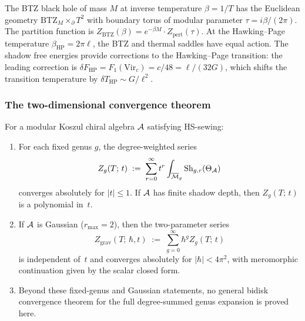 \begin{example}
\label{ex:thqg-I-btz-beta}
The BTZ black hole of mass $M$ at inverse temperature $\beta = 1/T$ has the Euclidean geometry $\mathrm{BTZ}_M \times_\partial T^2$ with boundary torus of modular parameter $\tau = i\beta/(2\pi)$. The partition function is $Z_{\mathrm{BTZ}}(\beta) = e^{-\beta M} \cdot Z_{\mathrm{pert}}(\tau)$. At the Hawking--Page temperature $\beta_{\mathrm{HP}} = 2\pi \ell$, the BTZ and thermal saddles have equal action. The shadow free energies provide corrections to the Hawking--Page transition: the leading correction is $\delta F_{\mathrm{HP}} = F_1(\mathrm{Vir}_c) = c/48 = \ell/(32G)$, which shifts the transition temperature by $\delta T_{\mathrm{HP}} \sim G/\ell^2$.
\end{example}

\subsubsection{The two-dimensional convergence theorem}

\begin{theorem}
\label{thm:thqg-I-2d-convergence}
For a modular Koszul chiral algebra $\mathcal{A}$ satisfying HS-sewing:
\begin{enumerate}[label=\textup{(\roman*)}]
\item For each fixed genus $g$, the degree-weighted series
\begin{equation}\label{eq:thqg-I-2d-convergence}
Z_g(T;\,t) \;:=\; \sum_{r=0}^\infty t^r
\int_{\overline{\mathcal{M}}_g} \operatorname{Sh}_{g,r}(\Theta_{\mathcal{A}})
\end{equation}
converges absolutely for $|t| \leq 1$. If $\mathcal{A}$ has finite shadow
depth, then $Z_g(T;\,t)$ is a polynomial in~$t$.
\item If $\mathcal{A}$ is Gaussian \textup{(}$r_{\max}=2$\textup{)}, then the
two-parameter series
\[
Z_{\mathrm{grav}}(T;\,\hbar,t)
\;:=\;
\sum_{g=0}^\infty \hbar^g Z_g(T;\,t)
\]
is independent of~$t$ and converges absolutely for $|\hbar|<4\pi^2$,
with meromorphic continuation given by the scalar closed form.
\item Beyond these fixed-genus and Gaussian statements, no general
bidisk convergence theorem for the full degree-summed genus expansion is
proved here.
\end{enumerate}
\end{theorem}

